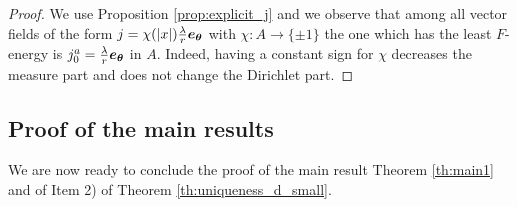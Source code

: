 \documentclass[12pt,reqno]{amsart}
\renewcommand{\vec}[1]{\text{\boldmath $#1$}}
\numberwithin{equation}{section}
\begin{document}
\begin{proof}
We use Proposition \ref{prop:explicit_j} and we observe that among all vector fields of the form \(j=\chi(|x|)\frac{\lambda}{r}\vec{e_\theta}\) with \(\chi:A \rightarrow \{\pm 1\}\) the one which has the least \(F\)-energy is \(j_0^a=\frac{\lambda}{r}\vec{e_\theta}\) in \(A\). Indeed, having a constant sign for \(\chi\) decreases the measure part and does not change the Dirichlet part.
\end{proof}

\subsection{Proof of the main results}
We are now ready to conclude the proof of the main result Theorem \ref{th:main1} and of Item 2) of Theorem \ref{th:uniqueness_d_small}.
\end{document}
